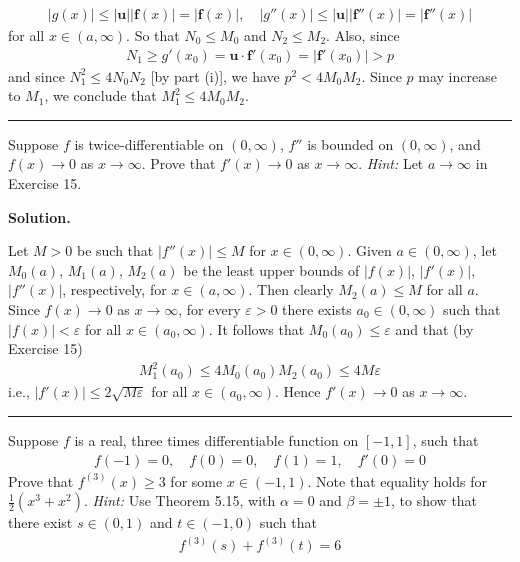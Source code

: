 \documentclass[12pt]{article}
\theoremstyle{definition}
\begin{document}
\begin{align*}
\left\vert g(x)\right\vert
\le\left\vert\mathbf{u}\right\vert\left\vert\mathbf{f}(x)\right\vert
=\left\vert\mathbf{f}(x)\right\vert,\quad
\left\vert g''(x)\right\vert
\le\left\vert\mathbf{u}\right\vert\left\vert\mathbf{f}''(x)\right\vert
=\left\vert\mathbf{f}''(x)\right\vert
\end{align*}
for all $x\in(a,\infty)$. So that $N_0\le M_0$ and $N_2\le M_2$. Also, since
\begin{align*}
N_1\ge g'(x_0)=\mathbf{u}\cdot\mathbf{f}'(x_0)=\left\vert\mathbf{f}'(x_0)\right\vert>p
\end{align*}
and since $N_1^2\le 4N_0N_2$ [by part (i)], we have $p^2<4M_0M_2$. Since $p$ may increase to $M_1$, we conclude that $M_1^2\le 4M_0M_2$.



\bigskip\noindent\hrule\bigskip

Suppose $f$ is twice-differentiable on $(0,\infty)$, $f''$ is bounded on $(0,\infty)$, and $f(x)\to 0$ as $x\to\infty$. Prove that $f'(x)\to 0$ as $x\to\infty$.
\textit{Hint:} Let $a\to\infty$ in Exercise 15.

\smallskip
\noindent\textbf{Solution.}\quad

Let $M>0$ be such that $\left\vert f''(x)\right\vert\le M$ for $x\in(0,\infty)$. Given $a\in(0,\infty)$, let $M_0(a)$, $M_1(a)$, $M_2(a)$ be the least upper bounds of $\left\vert f(x)\right\vert$, $\left\vert f'(x)\right\vert$, $\left\vert f''(x)\right\vert$, respectively, for $x\in(a,\infty)$. Then clearly $M_2(a)\le M$ for all $a$. Since $f(x)\to 0$ as $x\to\infty$, for every $\varepsilon>0$ there exists $a_0\in(0,\infty)$ such that $\left\vert f(x)\right\vert<\varepsilon$ for all $x\in(a_0,\infty)$. It follows that $M_0(a_0)\le\varepsilon$ and that (by Exercise 15)
\begin{align*}
M_1^2(a_0)\le 4M_0(a_0)M_2(a_0)\le 4M\varepsilon
\end{align*}
i.e., $\left\vert f'(x)\right\vert\le 2\sqrt{M\varepsilon}$ for all $x\in(a_0,\infty)$. Hence $f'(x)\to 0$ as $x\to\infty$.



\bigskip\noindent\hrule\bigskip

Suppose $f$ is a real, three times differentiable function on $[-1,1]$, such that
\begin{align*}
f(-1)=0,\quad f(0)=0,\quad f(1)=1,\quad f'(0)=0
\end{align*}
Prove that $f^{(3)}(x)\ge 3$ for some $x\in(-1,1)$.
Note that equality holds for $\tfrac{1}{2}(x^3+x^2)$.
\textit{Hint:} Use Theorem 5.15, with $\alpha=0$ and $\beta=\pm 1$, to show that there exist $s\in(0,1)$ and $t\in(-1,0)$ such that
\begin{align*}
f^{(3)}(s)+f^{(3)}(t)=6
\end{align*}
\end{document}
